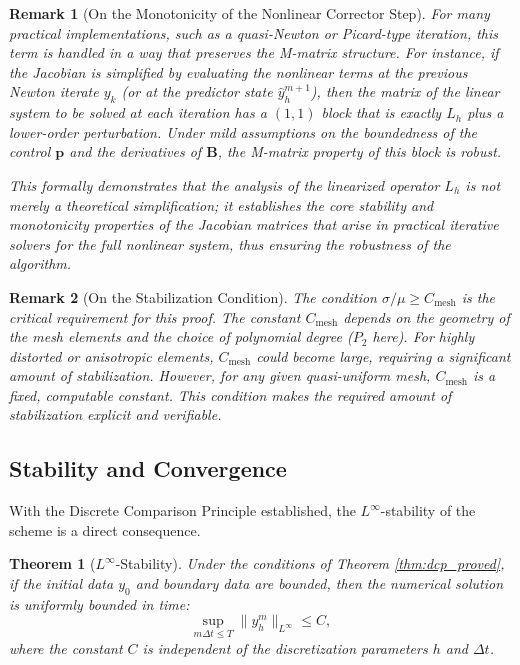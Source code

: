 \documentclass[pdflatex,sn-mathphys-num]{sn-jnl}%
\theoremstyle{thmstyleone}%
\newtheorem{thm}{Theorem}[section]
\newtheorem{rmk}{Remark}[section]
\numberwithin{equation}{section}
\begin{document}
\begin{rmk}[On the Monotonicity of the Nonlinear Corrector Step]
For many practical implementations, such as a quasi-Newton or Picard-type iteration, this term is handled in a way that preserves the M-matrix structure. For instance, if the Jacobian is simplified by evaluating the nonlinear terms at the previous Newton iterate $y_k$ (or at the predictor state $\hat{y}_h^{m+1}$), then the matrix of the linear system to be solved at each iteration has a $(1,1)$ block that is exactly $L_h$ plus a lower-order perturbation. Under mild assumptions on the boundedness of the control $\bm{p}$ and the derivatives of $\bm{B}$, the M-matrix property of this block is robust.

This formally demonstrates that the analysis of the linearized operator $L_h$ is not merely a theoretical simplification; it establishes the core stability and monotonicity properties of the Jacobian matrices that arise in practical iterative solvers for the full nonlinear system, thus ensuring the robustness of the algorithm.
\end{rmk}

\begin{rmk}[On the Stabilization Condition]
The condition $\sigma/\mu \ge C_{\text{mesh}}$ is the critical requirement for this proof. The constant $C_{\text{mesh}}$ depends on the geometry of the mesh elements and the choice of polynomial degree ($P_2$ here). For highly distorted or anisotropic elements, $C_{\text{mesh}}$ could become large, requiring a significant amount of stabilization. However, for any given quasi-uniform mesh, $C_{\text{mesh}}$ is a fixed, computable constant. This condition makes the required amount of stabilization explicit and verifiable.
\end{rmk}

\subsection{Stability and Convergence}

With the Discrete Comparison Principle established, the $L^\infty$-stability of the scheme is a direct consequence.

\begin{thm}[$L^\infty$-Stability]
\label{thm:stability_proved}
Under the conditions of Theorem \ref{thm:dcp_proved}, if the initial data $y_0$ and boundary data are bounded, then the numerical solution is uniformly bounded in time:
$$\sup_{m \Delta t \le T} \|y_h^m\|_{L^\infty} \le C,$$
where the constant $C$ is independent of the discretization parameters $h$ and $\Delta t$.
\end{thm}
\end{document}
